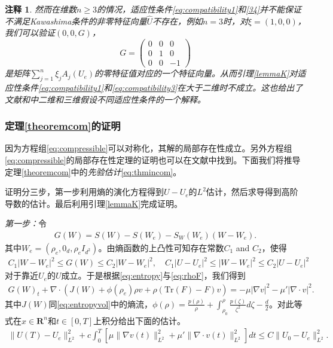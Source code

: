 \documentclass{article}
\newtheorem{remark}{注释}
\begin{document}
\begin{remark}
然而在维数$n \ge 3$的情况，适应性条件\eqref{eq:compatibility1}和\eqref{34}并不能保证不满足Kawashima条件的非零特征向量$\hat{U}$不存在，例如$n=3$时，对$\xi = (1,0,0)$，我们可以验证$(0,0, G)$，
 $$
 G = \left( \begin{array}{ccc}
 0 & 0 & 0 \\
 0 & 1 & 0 \\
 0 & 0 & -1 \end{array} \right)
 $$
是矩阵$ \sum_{j=1}^n \xi_j A_j(U_e)$的零特征值对应的一个特征向量。从而引理\ref{lemmaK}对适应性条件\eqref{eq:compatibility1}和\eqref{eq:compatibility3}在大于二维时不成立。这也给出了文献\cite{}和\cite{}中二维和三维假设不同适应性条件的一个解释。
\end{remark}

\subsubsection{定理\ref{theoremcom}的证明}
因为方程组\eqref{eq:compressible}可以对称化，其解的局部存在性成立\cite{kawashima1984systems}。另外方程组\eqref{eq:compressible}的局部存在性定理的证明也可以在文献\cite{lin2005hydrodynamics,lei2008global,hu2013global}中找到。下面我们将推导定理\ref{theoremcom}中的\emph{先验估计}\eqref{eq:thmincom}。

证明分三步，第一步利用熵的演化方程得到$U-U_e$的$L^2$估计，然后求导得到高阶导数的估计。最后利用引理\ref{lemmaK}完成证明。

\emph{第一步：}令
\begin{eqnarray*}
  G(W) = S(W) - S(W_e) - S_W(W_e) (W-W_e).
\end{eqnarray*}
其中$W_e = (\rho_e, 0_d, \rho_e I_{d^2})$。由熵函数的上凸性可知存在常数$C_1$ and $C_2$，使得
\begin{eqnarray*}
  C_1 |W-W_e|^2 \le G(W) \le C_2 |W-W_e|^2, \quad C_1 |U-U_e|^2 \le |W-W_e|^2 \le C_2 |U-U_e|^2
\end{eqnarray*}
对于靠近$U_e$的$U$成立。于是根据\eqref{eq:entropy}与\eqref{eq:rhoF}，我们得到
\begin{eqnarray*}
  G(W)_t + \nabla \cdot (J(W) + \phi(\rho_e) \rho  v  + \rho (\mbox{Tr}(F) - F) v ) = -\mu |\nabla  v |^2 - \mu' |\nabla \cdot  v |^2.
\end{eqnarray*}
其中$J(W)$同\eqref{eq:entropyvol}中的熵流，$\phi(\rho) = \frac{p(\rho)}{\rho} + \int_{\rho_0}^{\rho}\frac{p(\zeta)}{\zeta^2}d\zeta - \frac{d}{2}$。对此等式在$x\in\mathbf{R}^n$和$t\in[0, T]$上积分给出下面的估计。
\begin{eqnarray}\label{eq:EnergyESTcom}
  \|U(T) - U_e\|_{L^2}^2 + c \int_0^T[ \mu \|\nabla v (t)\|_{L^2}^2 +  \mu' \|\nabla \cdot  v (t)\|_{L^2}^2] dt
  \le C\|U_0-U_e\|_{L^2}^2 .
\end{eqnarray}
\end{document}
